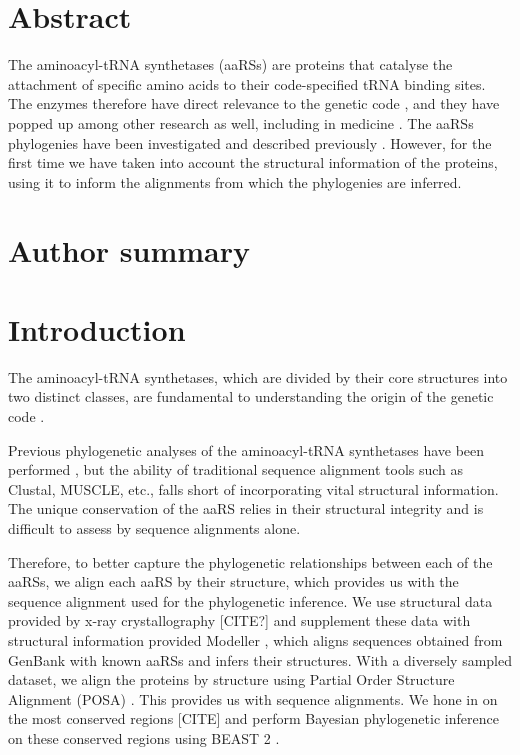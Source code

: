 \documentclass[10pt,letterpaper]{article}
\begin{document}
\section*{Abstract}
The aminoacyl-tRNA synthetases (aaRSs) are proteins that catalyse the attachment of specific amino acids to their code-specified tRNA binding sites.  The enzymes therefore have direct relevance to the genetic code \cite{Woese}, and they have popped up 
among other research as well, including in medicine \cite{MalariaProlyl}.
The aaRSs phylogenies have been investigated and described previously \cite{aaRSphylogeny1999} \cite{aaRSphylogeny2017}.  However, for the first time we have taken into account the structural information of the proteins, using it to inform the alignments from which the phylogenies are inferred.

\section*{Author summary}

\linenumbers

\section*{Introduction}
The aminoacyl-tRNA synthetases, which are divided by their core structures into two distinct classes, are fundamental to understanding the origin of the genetic code \cite{Woese}.

Previous phylogenetic analyses of the aminoacyl-tRNA synthetases have been performed \cite{aaRSphylogeny1999} \cite{aaRSphylogeny2017}, but the ability of traditional sequence alignment tools such as Clustal, MUSCLE, etc., falls short of 
incorporating vital structural information.  The unique conservation of the aaRS relies in their structural integrity and is difficult to assess by sequence alignments alone.  

Therefore, to better capture the phylogenetic relationships between each of the aaRSs, we align each aaRS by their structure, which provides us with the sequence alignment used for the phylogenetic inference.  
We use structural data provided by x-ray crystallography [CITE?] and supplement these data with structural information provided Modeller \cite{Modeller}, which aligns sequences obtained from GenBank with known aaRSs and infers their structures.
With a diversely sampled dataset, we align the proteins by structure using Partial Order Structure Alignment (POSA) \cite{POSA} \cite{POSA1}.  This provides us with sequence alignments.  We hone in on the most conserved regions [CITE] and perform 
Bayesian phylogenetic inference on these conserved regions using BEAST 2 \cite{BEAST2}.
\end{document}
